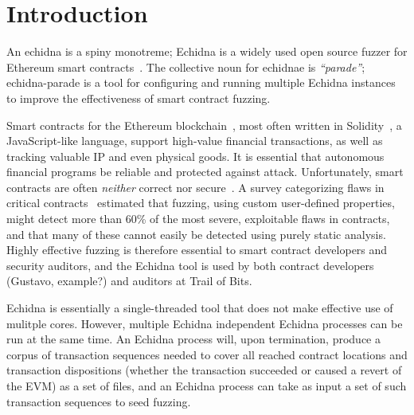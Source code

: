 \documentclass[sigconf]{acmart}
\begin{document}



\maketitle

\section{Introduction}

An echidna is a spiny monotreme; Echidna is a widely used open source fuzzer for
Ethereum smart contracts~\cite{echidnaissta,echidna-code}.  The collective noun for
echidnae is \emph{``parade''}; echidna-parade is a tool for configuring and
running multiple Echidna instances to improve the
effectiveness of smart contract fuzzing.

Smart contracts for the Ethereum blockchain~\cite{buterin2013whitepaper}, most often written in Solidity~\cite{wood2014yellow}, a
JavaScript-like language, support high-value financial transactions,
as well as tracking valuable IP and even physical goods.  It is essential that
autonomous financial programs be reliable and protected against
attack.  Unfortunately, smart contracts are often \emph{neither}
correct nor secure~\cite{SurveyAttacks}.  A survey categorizing flaws
in critical contracts~\cite{FC20} estimated that fuzzing, using custom
user-defined properties, might detect more than 60\% of the most
severe, exploitable flaws in contracts, and that many of these cannot easily
be detected using purely static analysis.  Highly effective fuzzing is
therefore essential to smart contract developers and security
auditors, and the Echidna tool is used by both contract developers
(Gustavo, example?) and auditors at Trail of Bits.

Echidna is essentially a single-threaded tool that does not make
effective use of mulitple cores.  However, multiple Echidna
independent Echidna processes can be run at the same time.  An Echidna
process will, upon termination, produce a corpus of transaction
sequences needed to cover all reached contract locations and
transaction dispositions (whether the transaction succeeded or caused
a revert of the EVM) as a set of files, and an Echidna process can
take as input a set of such transaction sequences to seed fuzzing.
\end{document}
